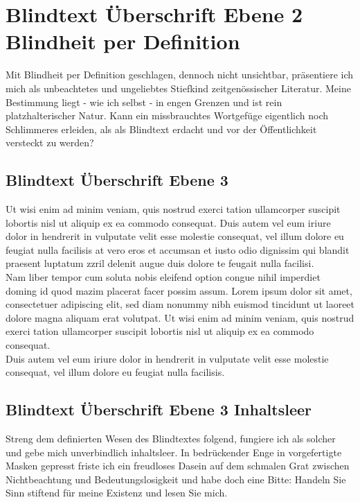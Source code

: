 \documentclass[
	ngerman,
	ruledheaders=section,%
	class=report,%
	thesis={type=bachelor},%
	accentcolor=1b,%
	custommargins=true,%
	marginpar=false,%
	parskip=half-,%
	fontsize=11pt,%
	DIV=14,
]{tudapub}
\begin{document}
\section{Blindtext Überschrift Ebene 2 Blindheit per Definition}
Mit Blindheit per Definition geschlagen, dennoch nicht unsichtbar, präsentiere ich mich als unbeachtetes und ungeliebtes Stiefkind zeitgenössischer Literatur. Meine Bestimmung liegt - wie ich selbst - in engen Grenzen und ist rein platzhalterischer Natur. Kann ein missbrauchtes Wortgefüge eigentlich noch Schlimmeres erleiden, als als Blindtext erdacht und vor der Öffentlichkeit versteckt zu werden?
\subsection{Blindtext Überschrift Ebene 3}
Ut wisi enim ad minim veniam, quis nostrud exerci tation ullamcorper suscipit lobortis nisl ut aliquip ex ea commodo consequat. Duis autem vel eum iriure dolor in hendrerit in vulputate velit esse molestie consequat, vel illum dolore eu feugiat nulla facilisis at vero eros et accumsan et iusto odio dignissim qui blandit praesent luptatum zzril delenit augue duis dolore te feugait nulla facilisi.\\
Nam liber tempor cum soluta nobis eleifend option congue nihil imperdiet doming id quod mazim placerat facer possim assum. Lorem ipsum dolor sit amet, consectetuer adipiscing elit, sed diam nonummy nibh euismod tincidunt ut laoreet dolore magna aliquam erat volutpat. Ut wisi enim ad minim veniam, quis nostrud exerci tation ullamcorper suscipit lobortis nisl ut aliquip ex ea commodo consequat.\\
Duis autem vel eum iriure dolor in hendrerit in vulputate velit esse molestie consequat, vel illum dolore eu feugiat nulla facilisis.
\subsection{Blindtext Überschrift Ebene 3 Inhaltsleer}
Streng dem definierten Wesen des Blindtextes folgend, fungiere ich als solcher und gebe mich unverbindlich inhaltsleer. In bedrückender Enge in vorgefertigte Masken gepresst friste ich ein freudloses Dasein auf dem schmalen Grat zwischen Nichtbeachtung und Bedeutungslosigkeit und habe doch eine Bitte: Handeln Sie Sinn stiftend für meine Existenz und lesen Sie mich.
\end{document}
